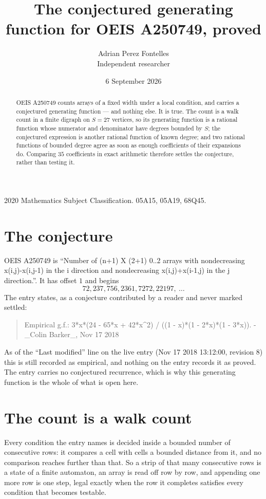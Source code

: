 \documentclass[11pt,a4paper]{article}
\title{The conjectured generating function for OEIS A250749, proved}
\author{Adrian Perez Fontelles\\ \small Independent researcher}
\date{6 September 2026}
\theoremstyle{plain}
\theoremstyle{definition}
\begin{document}
\maketitle

\begin{abstract}
OEIS A250749 counts arrays of a fixed width under a local condition, and carries a conjectured
generating function --- and nothing else. It is true. The count is a walk count in a finite
digraph on $S=27$ vertices, so its generating function is a rational function whose numerator
and denominator have degrees bounded by $S$; the conjectured expression is another rational
function of known degree; and two rational functions of bounded degree agree as soon as enough
coefficients of their expansions do. Comparing $35$ coefficients in exact arithmetic
therefore settles the conjecture, rather than testing it.
\end{abstract}

\noindent\small 2020 Mathematics Subject Classification. 05A15, 05A19, 68Q45.\normalsize

\section{The conjecture}

OEIS A250749 is ``Number of (n+1) X (2+1) 0..2 arrays with nondecreasing x(i,j)-x(i,j-1) in the i direction and nondecreasing x(i,j)+x(i-1,j) in the j direction.''. It has offset $1$ and begins
\[
72, 237, 756, 2361, 7272, 22197,\ \dots
\]
The entry states, as a conjecture contributed by a reader and never marked settled:
\begin{quote}
Empirical g.f.: 3*x*(24 - 65*x + 42*x\^{}2) / ((1 - x)*(1 - 2*x)*(1 - 3*x)). - \_Colin Barker\_, Nov 17 2018
\end{quote}
As of the ``Last modified'' line on the live entry (Nov 17 2018 13:12:00, revision 8) this is still
recorded as empirical, and nothing on the entry records it as proved. The entry carries no
conjectured recurrence, which is why this generating function is the whole of what is open
here.

\section{The count is a walk count}

Every condition the entry names is decided inside a bounded number of consecutive rows: it
compares a cell with cells a bounded distance from it, and no comparison reaches further than
that. So a strip of that many consecutive rows is a state of a finite automaton, an array is
read off row by row, and appending one more row is one step, legal exactly when the row it
completes satisfies every condition that becomes testable.
\end{document}
